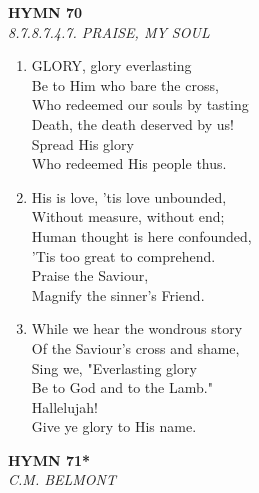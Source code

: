 \documentclass[11pt,a4paper]{article}
\begin{document}
\newpage
\begin{center}
    {\Large \textbf{HYMN 70}}
    \\
    \textit{8.7.8.7.4.7. PRAISE, MY SOUL}
\end{center}
\vspace{1em}

\begin{enumerate}
    \item GLORY, glory everlasting \\
        Be to Him who bare the cross, \\
        Who redeemed our souls by tasting \\
        Death, the death deserved by us! \\
        Spread His glory \\
        Who redeemed His people thus.

    \item His is love, 'tis love unbounded, \\
        Without measure, without end; \\
        Human thought is here confounded, \\
        'Tis too great to comprehend. \\
        Praise the Saviour, \\
        Magnify the sinner's Friend.

    \item While we hear the wondrous story \\
        Of the Saviour's cross and shame, \\
        Sing we, "Everlasting glory \\
        Be to God and to the Lamb." \\
        Hallelujah! \\
        Give ye glory to His name.

\end{enumerate}

\newpage
\begin{center}
    {\Large \textbf{HYMN 71*}}
    \\
    \textit{C.M. BELMONT}
\end{center}
\vspace{1em}
\end{document}

